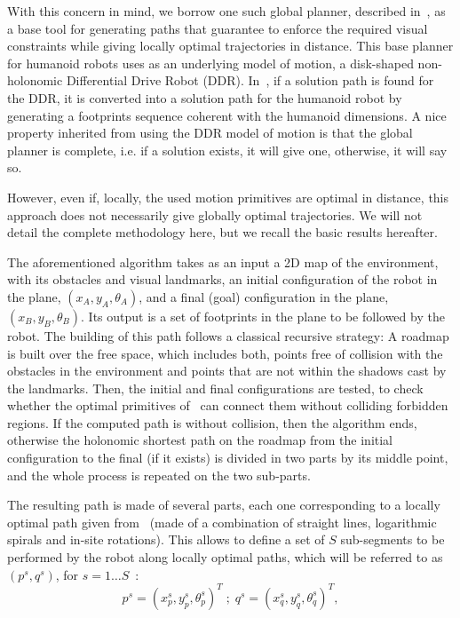 With this concern in mind, we borrow one such global planner, described in~\cite{jib-IJHR2010},  as a base tool for generating paths that guarantee to enforce the required visual constraints while giving locally optimal trajectories in distance. This base planner for humanoid robots uses as an underlying model of motion, a disk-shaped non-holonomic Differential Drive Robot (DDR). In~\cite{jib-IJHR2010}, if a solution path is found for the DDR, it is converted into a solution path for the humanoid robot by generating a footprints sequence coherent with the humanoid dimensions. A nice property inherited from using the DDR model of motion is that the global planner is complete, i.e.  if a solution exists, it will give one, otherwise, it will say so.

However, even if, locally, the used motion primitives are optimal in distance, this approach does not necessarily give globally optimal trajectories. We will not detail the complete methodology here, but we recall the basic results hereafter.

The aforementioned algorithm takes as an input a 2D map of the environment, with its obstacles and visual landmarks, an initial configuration of the robot in the plane, $(x_A,y_A,\theta_A)$, and a final (goal) configuration in the plane, $(x_B,y_B,\theta_B)$. Its output is a set of footprints in the plane to be followed by the robot. The building of this path follows a classical recursive strategy: A roadmap is built over the free space, which includes both, points free of collision with the obstacles in the environment and points that are not within the shadows cast by the landmarks. Then, the initial and final configurations are tested, to check whether the optimal primitives of~\cite{Salaris:2010} can connect them without colliding forbidden regions. If the computed path is without collision, then the algorithm ends, otherwise the holonomic shortest path on the roadmap from the initial configuration to the final (if it exists) is divided in two parts by its middle point, and the whole process is repeated on the two sub-parts. 

The resulting path is made of several parts, each one corresponding to a locally optimal path given from~\cite{Salaris:2010} (made of a combination of straight lines, logarithmic spirals and in-site rotations). This allows to define a set of $S$ sub-segments to be performed by the robot along locally optimal paths, which will be referred to as $(p^s,q^s)$, for $s=1\dots S$~:
$$
p^s = (x_p^s,y_p^s,\theta_p^s)^T \; ; \; q^s = (x_q^s,y_q^s,\theta_q^s)^T,
$$

